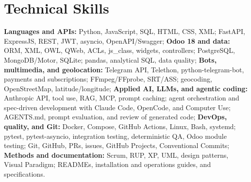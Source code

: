 \section{Technical Skills}

{\small
\textbf{Languages and APIs:} Python, JavaScript, SQL, HTML, CSS, XML; FastAPI, ExpressJS, REST, JWT, asyncio, \mbox{OpenAPI/Swagger}; \textbf{Odoo 18 and data:} ORM, XML, OWL, QWeb, ACLs, \mbox{js\_class}, widgets, controllers; PostgreSQL, \mbox{MongoDB/Motor}, SQLite; pandas, analytical SQL, data quality; \textbf{Bots, multimedia, and geolocation:} Telegram API, Telethon, \mbox{python-telegram-bot}, payments and subscriptions; \mbox{FFmpeg/FFprobe}, \mbox{SRT/ASS}; geocoding, \mbox{OpenStreetMap}, latitude/longitude; \textbf{Applied AI, LLMs, and agentic coding:} Anthropic API, tool use, RAG, MCP, prompt caching; agent orchestration and spec-driven development with Claude Code, OpenCode, and Computer Use; AGENTS.md, prompt evaluation, and review of generated code; \textbf{DevOps, quality, and Git:} Docker, Compose, GitHub Actions, Linux, Bash, \mbox{systemd}; pytest, \mbox{pytest-asyncio}, integration testing, deterministic QA, Odoo module testing; Git, GitHub, PRs, issues, GitHub Projects, Conventional Commits; \textbf{Methods and documentation:} Scrum, RUP, XP, UML, design patterns, Visual Paradigm; READMEs, installation and operations guides, and specifications.\par
}
